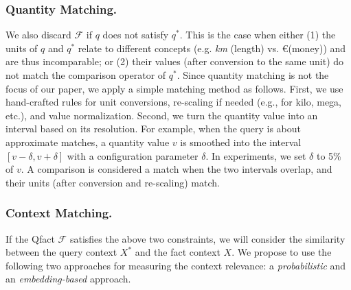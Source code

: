 \subsubsection{Quantity Matching.} We also discard $\mathcal{F}$ if $q$ does not satisfy $q^*$. This is the case when either (1) the units of $q$ and $q^*$ relate to different concepts (e.g. \textit{km} (length) vs. \euro (money)) and are thus incomparable; or (2) their values (after conversion to the same unit) do not match the comparison operator of $q^*$. Since quantity matching is not the focus of our paper, we apply a simple matching method as follows. First, we use hand-crafted rules for unit conversions, re-scaling if needed (e.g., for kilo, mega, etc.), and value normalization. Second, we turn the quantity value into an interval based on its resolution. For example, when the query is about approximate matches, a quantity value $v$ is smoothed into the interval $[v-\delta, v+\delta]$ with a configuration parameter $\delta$. In experiments, we set $\delta$ to 5\% of $v$. A comparison is considered a match when the two intervals overlap, and their units (after conversion and re-scaling) match.

\subsubsection{Context Matching.} If the Qfact $\mathcal{F}$ satisfies the above two constraints, we will consider the similarity between the query context $X^*$ and the fact context $X$. We propose to use the following two approaches for measuring the context relevance: a \textit{probabilistic} and an \textit{embedding-based} approach.\\

